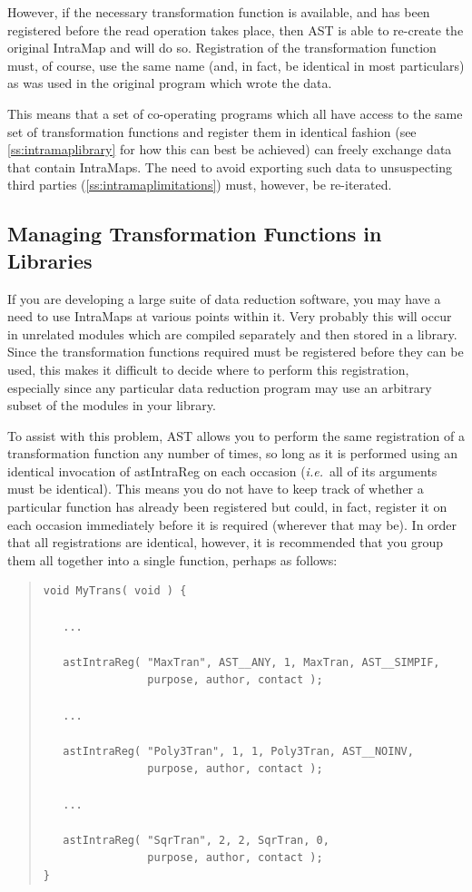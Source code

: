 \documentclass[twoside,11pt]{article}
\newcommand{\htmlref}[2]{#1}
\newcommand{\secref}[1]{\S\ref{#1}}
\renewcommand{\secref}[1]{\ref{#1}}
\begin{document}
However, if the necessary transformation function is available, and
has been registered before the read operation takes place, then AST is
able to re-create the original IntraMap and will do so. Registration
of the transformation function must, of course, use the same name
(and, in fact, be identical in most particulars) as was used in the
original program which wrote the data.

This means that a set of co-operating programs which all have access
to the same set of transformation functions and register them in
identical fashion (see \secref{ss:intramaplibrary} for how this can
best be achieved) can freely exchange data that contain IntraMaps. The
need to avoid exporting such data to unsuspecting third parties
(\secref{ss:intramaplimitations}) must, however, be re-iterated.

\subsection{\label{ss:intramaplibrary}Managing Transformation Functions in Libraries}

If you are developing a large suite of data reduction software, you
may have a need to use IntraMaps at various points within it. Very
probably this will occur in unrelated modules which are compiled
separately and then stored in a library. Since the transformation
functions required must be registered before they can be used, this
makes it difficult to decide where to perform this registration,
especially since any particular data reduction program may use an
arbitrary subset of the modules in your library.

To assist with this problem, AST allows you to perform the same
registration of a transformation function any number of times, so long
as it is performed using an identical invocation of \htmlref{astIntraReg}{astIntraReg} on
each occasion ({\em{i.e.}}\ all of its arguments must be
identical). This means you do not have to keep track of whether a
particular function has already been registered but could, in fact,
register it on each occasion immediately before it is required
(wherever that may be). In order that all registrations are identical,
however, it is recommended that you group them all together into a
single function, perhaps as follows:

\begin{quote}
\small
\begin{verbatim}
void MyTrans( void ) {

   ...

   astIntraReg( "MaxTran", AST__ANY, 1, MaxTran, AST__SIMPIF,
                purpose, author, contact );

   ...

   astIntraReg( "Poly3Tran", 1, 1, Poly3Tran, AST__NOINV,
                purpose, author, contact );

   ...

   astIntraReg( "SqrTran", 2, 2, SqrTran, 0,
                purpose, author, contact );
}
\end{verbatim}
\normalsize
\end{quote}
\end{document}

